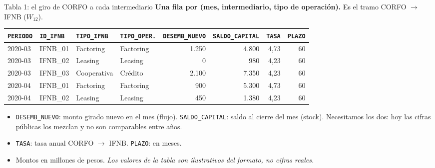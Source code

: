 \documentclass[aspectratio=169]{beamer}
\begin{document}
\begin{frame}{Tabla 1: el giro de CORFO a cada intermediario}
\textbf{Una fila por (mes, intermediario, tipo de operación).} Es el tramo CORFO $\to$ IFNB ($W_{12}$).

\vspace{0.25cm}
\begin{table}
\centering
\scriptsize
\begin{tabular}{@{}llllrrrr@{}}
\toprule
\texttt{PERIODO} & \texttt{ID\_IFNB} & \texttt{TIPO\_IFNB} & \texttt{TIPO\_OPER.} & \texttt{DESEMB\_NUEVO} & \texttt{SALDO\_CAPITAL} & \texttt{TASA} & \texttt{PLAZO} \\
\midrule
2020-03 & IFNB\_01 & Factoring   & Factoring & 1.250 & 4.800 & 4,73 & 60 \\
2020-03 & IFNB\_02 & Leasing     & Leasing   &     0 &   980 & 4,23 & 60 \\
2020-03 & IFNB\_03 & Cooperativa & Crédito   & 2.100 & 7.350 & 4,23 & 60 \\
2020-04 & IFNB\_01 & Factoring   & Factoring &   900 & 5.300 & 4,73 & 60 \\
2020-04 & IFNB\_02 & Leasing     & Leasing   &   450 & 1.380 & 4,23 & 60 \\
\bottomrule
\end{tabular}
\end{table}

\vspace{0.1cm}
\footnotesize
\begin{itemize}\footnotesize
    \item \texttt{DESEMB\_NUEVO}: monto girado nuevo en el mes (flujo). \texttt{SALDO\_CAPITAL}: saldo al cierre del mes (stock). \alert{Necesitamos los dos}: hoy las cifras públicas los mezclan y no son comparables entre años.
    \item \texttt{TASA}: tasa anual CORFO $\to$ IFNB. \texttt{PLAZO}: en meses.
    \item Montos en millones de pesos. \emph{Los valores de la tabla son ilustrativos del formato, no cifras reales.}
\end{itemize}
\end{frame}
\end{document}
